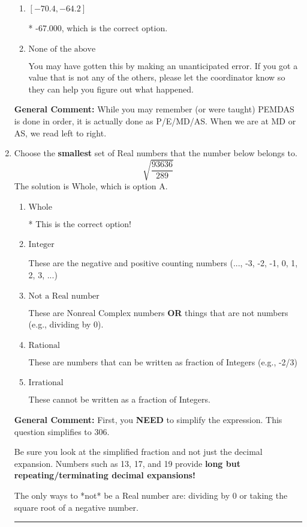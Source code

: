 \documentclass{extbook}[14pt]
\newcommand{\litem}[1]{\item #1

\rule{\textwidth}{0.4pt}}
\begin{document}
\begin{enumerate}
{\begin{enumerate}[label=\Alph*.]
 -63.028, which corresponds to an Order of Operations error: not reading left-to-right for multiplication/division.
\item \( [-70.4, -64.2] \)

* -67.000, which is the correct option.
\item \( \text{None of the above} \)

 You may have gotten this by making an unanticipated error. If you got a value that is not any of the others, please let the coordinator know so they can help you figure out what happened.
\end{enumerate}

\textbf{General Comment:} While you may remember (or were taught) PEMDAS is done in order, it is actually done as P/E/MD/AS. When we are at MD or AS, we read left to right.
}
\litem{
Choose the \textbf{smallest} set of Real numbers that the number below belongs to.
\[ \sqrt{\frac{93636}{289}} \]The solution is \( \text{Whole} \), which is option A.\begin{enumerate}[label=\Alph*.]
\item \( \text{Whole} \)

* This is the correct option!
\item \( \text{Integer} \)

These are the negative and positive counting numbers (..., -3, -2, -1, 0, 1, 2, 3, ...)
\item \( \text{Not a Real number} \)

These are Nonreal Complex numbers \textbf{OR} things that are not numbers (e.g., dividing by 0).
\item \( \text{Rational} \)

These are numbers that can be written as fraction of Integers (e.g., -2/3)
\item \( \text{Irrational} \)

These cannot be written as a fraction of Integers.
\end{enumerate}

\textbf{General Comment:} First, you \textbf{NEED} to simplify the expression. This question simplifies to $306$. 
 
 Be sure you look at the simplified fraction and not just the decimal expansion. Numbers such as 13, 17, and 19 provide \textbf{long but repeating/terminating decimal expansions!} 
 
 The only ways to *not* be a Real number are: dividing by 0 or taking the square root of a negative number. 
 
}
\end{enumerate}
\end{document}
